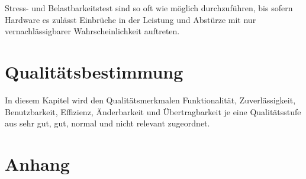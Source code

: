 \documentclass{article}
\begin{document}
\begin{T}[start = 10]
 \item Stress- und Belastbarkeitstest sind so oft wie möglich durchzuführen, bis sofern Hardware es zulässt 
       Einbrüche in der Leistung und Abstürze mit nur vernachlässigbarer Wahrscheinlichkeit auftreten.
\end{T}

\section{Qualitätsbestimmung}

In diesem Kapitel wird den Qualitätsmerkmalen Funktionalität, Zuverlässigkeit, Benutzbarkeit, Effizienz, Änderbarkeit und Übertragbarkeit je eine Qualitätsstufe aus sehr gut, gut, normal und nicht relevant zugeordnet. 
 
\section{Anhang}

\glsaddall
\printglossary[numberedsection, style=altlist]
\end{document}
